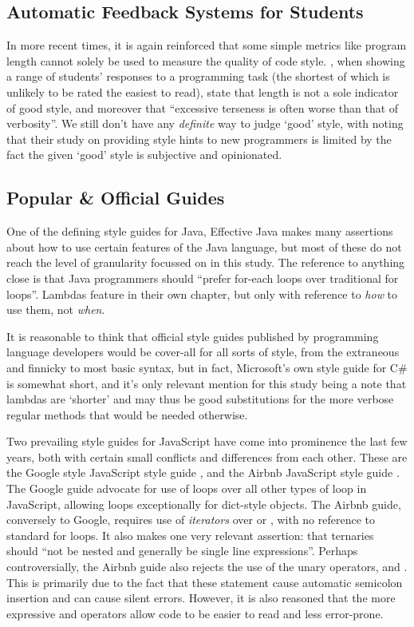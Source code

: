 \documentclass{article}
\begin{document}
    \subsection{Automatic Feedback Systems for Students}
        In more recent times, it is again reinforced that some simple metrics like program length cannot solely be used to measure the quality of code style. \cite{autoStyleFeedbackAtScale}, when showing a range of students' responses to a programming task (the shortest of which is unlikely to be rated the easiest to read), state that length is not a sole indicator of good style, and moreover that ``excessive terseness is often worse than that of verbosity''. We still don't have any \emph{definite} way to judge `good' style, with \cite{scaleDrivenHints} noting that their study on providing style hints to new programmers is limited by the fact the given `good' style is subjective and opinionated.

    \subsection{Popular \& Official Guides}
        One of the defining style guides for Java, Effective Java \citep{effectiveJava} makes many assertions about how to use certain features of the Java language, but most of these do not reach the level of granularity focussed on in this study. The reference to anything close is that Java programmers should ``prefer for-each loops over traditional for loops''. Lambdas feature in their own chapter, but only with reference to \emph{how} to use them, not \emph{when}.

        It is reasonable to think that official style guides published by programming language developers would be cover-all for all sorts of style, from the extraneous and finnicky to most basic syntax, but in fact, Microsoft's own style guide for C\# is somewhat short, and it's only relevant mention for this study being a note that lambdas are `shorter' and may thus be good substitutions for the more verbose regular methods that would be needed otherwise.

        Two prevailing style guides for JavaScript have come into prominence the last few years, both with certain small conflicts and differences from each other. These are the Google style JavaScript style guide \citep{googleJSStyle}, and the Airbnb JavaScript style guide \citep{airbnbJSStyle}. The Google guide advocate for use of  loops over all other types of  loop in JavaScript, allowing  loops exceptionally for dict-style objects. The Airbnb guide, conversely to Google, requires use of \emph{iterators} over  or , with no reference to standard for loops. It also makes one very relevant assertion: that ternaries should ``not be nested and generally be single line expressions''. Perhaps controversially, the Airbnb guide also rejects the use of the unary operators, \codeword{++} and \codeword{--}. This is primarily due to the fact that these statement cause automatic semicolon insertion and can cause silent errors. However, it is also reasoned that the more expressive \codeword{+=} and \codeword{-=} operators allow code to be easier to read and less error-prone.
\end{document}
